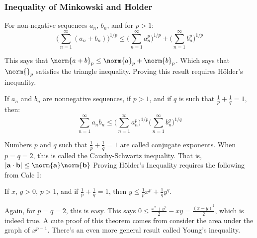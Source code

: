 \documentclass[crop=false,class=article,oneside]{standalone}
\begin{document}
        \subsubsection{Inequality of Minkowski and Holder}
            \begin{theorem}
                For non-negative sequences
                $a_{n}$, $b_{n}$, and for $p>1$:
                \begin{equation*}
                    \bigg(
                        \sum_{n=1}^{\infty}(a_{n}+b_{n})
                    \bigg)^{1/p}
                    \leq
                    \bigg(
                        \sum_{n=1}^{\infty}a_{n}^{p}
                    \bigg)^{1/p}
                    +
                    \bigg(
                        \sum_{n=1}^{\infty}b_{n}^{p}
                    \bigg)^{1/p}
                \end{equation*}
            \end{theorem}
            This says that
            $\norm{a+b}_{p}\leq\norm{a}_{p}+\norm{b}_{p}$.
            Which says that $\norm{}_{p}$ satisfies
            the triangle inequality. Proving this result
            requires H\"{o}lder's inequality.
            \begin{theorem}
                If $a_{n}$ and $b_{n}$ are nonnegative
                sequences, if $p>1$, and if $q$ is
                such that
                $\frac{1}{p}+\frac{1}{q}=1$, then:
                \begin{equation*}
                    \sum_{n=1}^{\infty}a_{n}b_{n}
                    \leq
                    \bigg(
                        \sum_{n=1}^{\infty}a_{n}^{p}
                    \bigg)^{1/p}
                    \bigg(
                        \sum_{n=1}^{\infty}b_{n}^{q}
                    \bigg)^{1/q}
                \end{equation*}
            \end{theorem}
            Numbers $p$ and $q$ such that
            $\frac{1}{p}+\frac{1}{q}=1$ are called
            conjugate exponents. When $p=q=2$, this
            is called the Cauchy-Schwartz inequality.
            That is,
            $|\mathbf{a}\cdot\mathbf{b}|%
             \leq\norm{\mathbf{a}}\norm{\mathbf{b}}$
            Proving H\"{o}lder's Inequality requires the
            following from Calc I:
            \begin{theorem}
                If $x$, $y>0$, $p>1$, and if
                $\frac{1}{p}+\frac{1}{q}=1$, then
                $y\leq{\frac{1}{p}x^{p}+\frac{1}{q}y^{q}}$.
            \end{theorem}
            Again, for $p=q=2$, this is easy.
            This says
            $0\leq{\frac{x^{2}+y^{2}}{2}-xy}%
             =\frac{(x-y)^{2}}{2}$, which is indeed true.
            A cute proof of this theorem comes from
            consider the area under the graph of
            $x^{p-1}$. There's an even more general
            result called Young's inequality.
\end{document}

